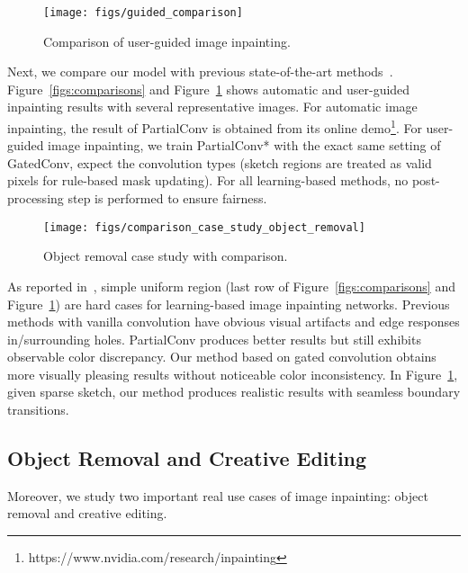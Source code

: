 \documentclass[10pt,twocolumn,letterpaper]{article}
\begin{document}
\begin{figure}[t]
  \centering
  \texttt{[image: figs/guided\_comparison]}
  \vspace{-8mm}
  \caption{Comparison of user-guided image inpainting.}
  \label{figs:guided_comparisons}
  \vspace{-2mm}
\end{figure}

Next, we compare our model with previous state-of-the-art methods~\cite{iizuka2017globally, liu2018image, yu2018generative}.
Figure~\ref{figs:comparisons} and Figure~\ref{figs:guided_comparisons} shows automatic and user-guided inpainting results with several representative images.
For automatic image inpainting, the result of PartialConv is obtained from its online demo\footnote{https://www.nvidia.com/research/inpainting}.
For user-guided image inpainting, we train PartialConv* with the exact same setting of GatedConv, expect the convolution types (sketch regions are treated as valid pixels for rule-based mask updating). For all learning-based methods, no post-processing step is performed to ensure fairness.

\begin{figure*}[ht]
  \centering
  \vspace{-6mm}
  \texttt{[image: figs/comparison\_case\_study\_object\_removal]}
  \vspace*{-8mm}
  \caption{Object removal case study with comparison.}
  \label{figs:object_removal}
\end{figure*}

As reported in~\cite{iizuka2017globally}, simple uniform region (last row of Figure~\ref{figs:comparisons} and Figure~\ref{figs:guided_comparisons}) are hard cases for learning-based image inpainting networks.
Previous methods with vanilla convolution have obvious visual artifacts and edge responses in/surrounding holes.
PartialConv produces better results but still exhibits observable color discrepancy.
Our method based on gated convolution obtains more visually pleasing results without noticeable color inconsistency.
In Figure~\ref{figs:guided_comparisons}, given sparse sketch, our method produces realistic results with seamless boundary transitions.


\subsection{Object Removal and Creative Editing}
Moreover, we study two important real use cases of image inpainting: object removal and creative editing.
\end{document}
